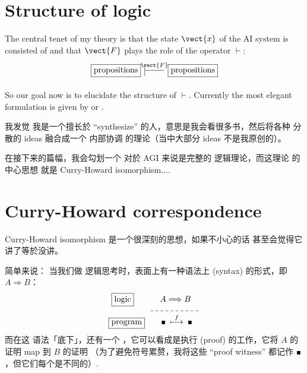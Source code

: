 \section{Structure of logic}

The central tenet of my theory is that the state $\vect{x}$ of the AI system is consisted of  and that $\vect{F}$ plays the role of the  operator $\vdash$:
\begin{equation}
\begin{tikzcd}[| /.tip = {Bar[scale=3]}]
\boxed{\mbox{propositions}}
\arrow[r, |-, "\vect{F}"]
& \boxed{\mbox{propositions}}
\end{tikzcd}
\end{equation}

So our goal now is to elucidate the structure of $\vdash$.  Currently the most elegant formulation is given by  or .

我发觉 我是一个擅长於 ``synthesize'' 的人，意思是我会看很多书，然后将各种 分散的 ideas 融合成一个 内部协调 的理论（当中大部分 ideas 不是我原创的）。

在接下来的篇幅，我会勾划一个 对於 AGI 来说是完整的 逻辑理论，而这理论 的中心思想 就是 Curry-Howard isomorphism....

\section{Curry-Howard correspondence}

Curry-Howard isomorphism 是一个很深刻的思想，如果不小心的话 甚至会觉得它讲了等於没讲。 


简单来说： 当我们做 逻辑思考时，表面上有一种语法上 (syntax) 的形式，即 $A \Rightarrow B$：
\begin{equation}
\label{eqn:Curry-Howard}
\begin{aligned}
\boxed{\mbox{logic}} \quad \quad \underdash{$A \Longrightarrow B$} & \\
\boxed{\mbox{program}} \quad \quad \witness \; \stackrel{f}{\longmapsto} \; \witness \hspace*{10pt} &
\end{aligned}
\end{equation}
而在这 语法「底下」，还有一个 ，它可以看成是执行  (proof) 的工作，它将 $A$ 的证明 map 到 $B$ 的证明 （为了避免符号累赘，我将这些 ``proof witness'' 都记作 $\witness$，但它们每个是不同的）.

